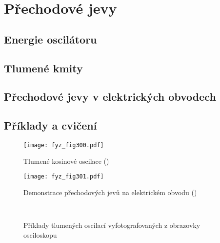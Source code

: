 \setchaptertoc
\chapter{Přechodové jevy}\label{fyz:IchapXXIV}

  \section{Energie oscilátoru}\label{fyz:IchapXXIVsecI}
  \section{Tlumené kmity}\label{fyz:IchapXXIVsecII}
  \section{Přechodové jevy v elektrických obvodech}\label{fyz:IchapXXVIVsecIII}
  \section{Příklady a cvičení}\label{fyz:IchapXXIVsecIV}

    \begin{figure}[ht!] %
      \centering
      \texttt{[image: fyz\_fig300.pdf]}
      \caption{Tlumené kosinové oscilace 
               (\cite[s.~326]{Feynman01})}
      \label{fyz:fig300}
    \end{figure}

    \begin{figure}[ht!] %
      \centering
      \texttt{[image: fyz\_fig301.pdf]}
      \caption{Demonstrace přechodových jevů na elektrickém obvodu 
               (\cite[s.~328]{Feynman01})}
      \label{fyz:fig301}
    \end{figure}
    

    \begin{figure}[ht!]      %
      \centering
               \\
      \caption{Příklady tlumených oscilací vyfotografovaných z obrazovky osciloskopu
               \cite[s.~329]{Feynman01}}
      \label{fyz:fig302}
    \end{figure}

